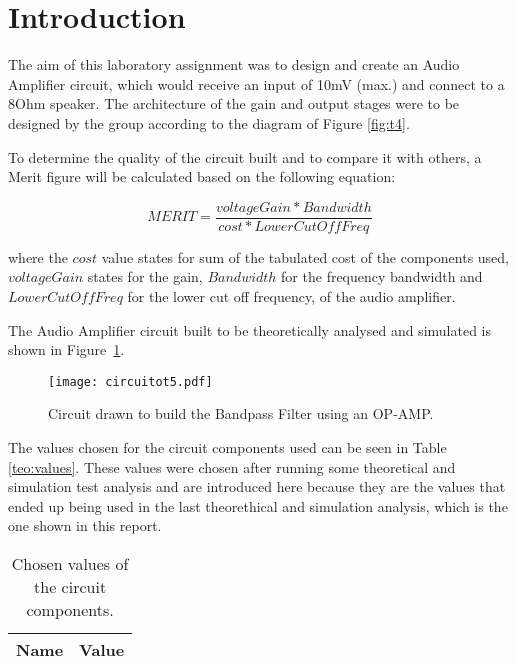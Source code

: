 \newpage
\section{Introduction}
\label{sec:introduction}


The aim of this laboratory assignment was to design and create an Audio Amplifier circuit, which would receive an input of 10mV (max.) and connect to a 8Ohm speaker. The architecture of the gain and output stages were to be designed by the group according to the diagram of Figure \ref{fig:t4}. 



To determine the quality of the circuit built and to compare it with others, a Merit figure will be calculated based on the following equation: 

\begin {equation}
	MERIT = \frac{voltageGain*Bandwidth}{cost*LowerCutOffFreq}   	
\label{eq:merit}
\end{equation}

where the $cost$ value states for sum of the tabulated cost of the components used, $voltageGain$ states for the gain, $Bandwidth$ for the frequency bandwidth and $LowerCutOffFreq$ for the lower cut off frequency, of the audio amplifier.

The Audio Amplifier circuit built to be theoretically analysed and simulated is shown in Figure~\ref{fig:audio_amplifier}. 

\begin{figure}[H] \centering
	\texttt{[image: circuitot5.pdf]}
	\caption{Circuit drawn to build the Bandpass Filter using an OP-AMP.}
	\label{fig:audio_amplifier}
\end{figure}

The values chosen for the circuit components used can be seen in Table \ref{teo:values}. These values were chosen after running some theoretical and simulation test analysis and are introduced here because they are the values that ended up being used in the last theorethical and simulation analysis, which is the one shown in this report.

\begin{table}[H]
	\centering
	\begin{tabular}{|l|r|}
		\hline    
		{\bf Name} & {\bf Value} \\ \hline
		
	\end{tabular}
	\caption{Chosen values of the circuit components.}
	\label{tab:values}
\end{table}

